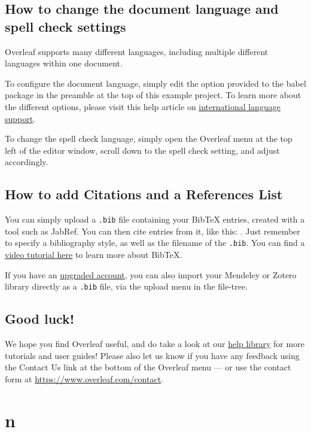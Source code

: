 \documentclass[14pt]{extarticle} %
\theoremstyle{problemastyle} %
\begin{document}
\subsection{How to change the document language and spell check settings}

Overleaf supports many different languages, including multiple different languages within one document. 

To configure the document language, simply edit the option provided to the babel package in the preamble at the top of this example project. To learn more about the different options, please visit this help article on \href{https://www.overleaf.com/learn/latex/International_language_support}{international language support}.

To change the spell check language, simply open the Overleaf menu at the top left of the editor window, scroll down to the spell check setting, and adjust accordingly.

\subsection{How to add Citations and a References List}

You can simply upload a \verb|.bib| file containing your BibTeX entries, created with a tool such as JabRef. You can then cite entries from it, like this: \cite{greenwade93}. Just remember to specify a bibliography style, as well as the filename of the \verb|.bib|. You can find a \href{https://www.overleaf.com/help/97-how-to-include-a-bibliography-using-bibtex}{video tutorial here} to learn more about BibTeX.

If you have an \href{https://www.overleaf.com/user/subscription/plans}{upgraded account}, you can also import your Mendeley or Zotero library directly as a \verb|.bib| file, via the upload menu in the file-tree.

\subsection{Good luck!}

We hope you find Overleaf useful, and do take a look at our \href{https://www.overleaf.com/learn}{help library} for more tutorials and user guides! Please also let us know if you have any feedback using the Contact Us link at the bottom of the Overleaf menu --- or use the contact form at \url{https://www.overleaf.com/contact}.

\section{ n}



\end{document}
